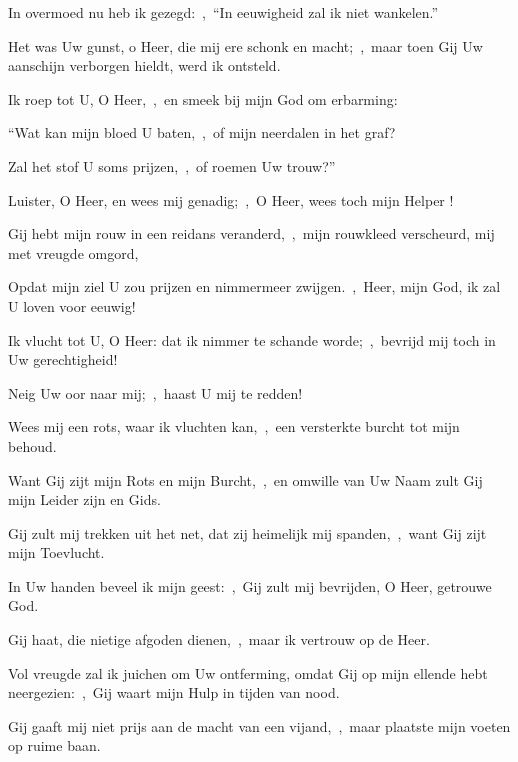 \documentclass[12pt,twoside,a5paper]{article}
\begin{document}

\begin{halfparskip}
  In overmoed nu heb ik gezegd:~\sep\ ``In eeuwigheid zal ik niet wankelen.''

  Het was Uw gunst, o Heer, die mij ere schonk en macht;~\sep\ maar toen Gij Uw aanschijn verborgen hieldt, werd ik ontsteld.

  Ik roep tot U, O Heer,~\sep\ en smeek bij mijn God om erbarming:

  ``Wat kan mijn bloed U baten,~\sep\ of mijn neerdalen in het graf?

  Zal het stof U soms prijzen,~\sep\ of roemen Uw trouw?''

  Luister, O Heer, en wees mij genadig;~\sep\ O Heer, wees toch mijn Helper !

  Gij hebt mijn rouw in een reidans veranderd,~\sep\ mijn rouwkleed verscheurd, mij met vreugde omgord,

  Opdat mijn ziel U zou prijzen en nimmermeer zwijgen.~\sep\ Heer, mijn God, ik zal U loven voor eeuwig!
\end{halfparskip}







\begin{halfparskip}
  Ik vlucht tot U, O Heer: dat ik nimmer te schande worde;~\sep\ bevrijd mij toch in Uw gerechtigheid!


  Neig Uw oor naar mij;~\sep\ haast U mij te redden!

  Wees mij een rots, waar ik vluchten kan,~\sep\ een versterkte burcht tot mijn behoud.

  Want Gij zijt mijn Rots en mijn Burcht,~\sep\ en omwille van Uw Naam zult Gij mijn Leider zijn en Gids.

  Gij zult mij trekken uit het net, dat zij heimelijk mij spanden,~\sep\ want Gij zijt mijn Toevlucht.

  In Uw handen beveel ik mijn geest:~\sep\ Gij zult mij bevrijden, O Heer, getrouwe God.

  Gij haat, die nietige afgoden dienen,~\sep\ maar ik vertrouw op de Heer.

  Vol vreugde zal ik juichen om Uw ontferming, omdat Gij op mijn ellende hebt neergezien:~\sep\ Gij waart mijn Hulp in tijden van nood.

  Gij gaaft mij niet prijs aan de macht van een vijand,~\sep\ maar plaatste mijn voeten op ruime baan.
\end{halfparskip}
\end{document}

